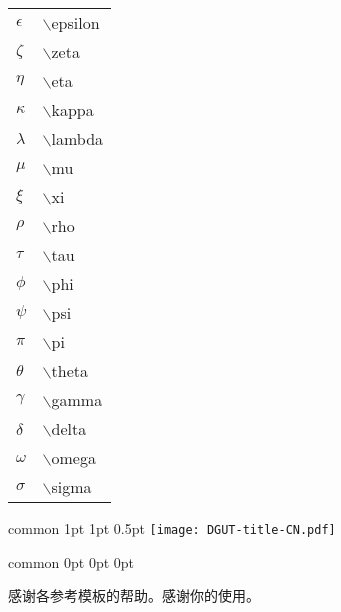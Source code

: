 \documentclass[report,oneside,UTF8,zihao=-4]{config}
\begin{document}
\begin{center}
\begin{tabular}{ll}
    $\epsilon$ &  $\backslash$epsilon \\
    $\zeta$ &  $\backslash$zeta \\
    $\eta$ &  $\backslash$eta \\
    $\kappa$ &  $\backslash$kappa \\
    $\lambda$ &  $\backslash$lambda \\
    $\mu$ &  $\backslash$mu \\
    $\xi$ &  $\backslash$xi \\
    $\rho$ &  $\backslash$rho \\
    $\tau$ &  $\backslash$tau \\
    $\phi$ &  $\backslash$phi \\
    $\psi$ &  $\backslash$psi \\
    $\pi$ &  $\backslash$pi \\
    $\theta$ &  $\backslash$theta \\
    $\gamma$ &  $\backslash$gamma\\
    $\delta$ &  $\backslash$delta \\
    $\omega$ &  $\backslash$omega \\
    $\sigma$ &  $\backslash$sigma \\
    \end{tabular}
\end{center}


\Header
    {common} %
    {1pt} %
    {1pt} %
    {0.5pt} %
    {} %
    {\texttt{[image: DGUT-title-CN.pdf]}} %
    {} %


\Footer
    {common} %
    {0pt} %
    {0pt} %
    {0pt} %
    {} %
    {\thepage} %
    {} %




\StartAcknowledgements %

感谢各参考模板的帮助。感谢你的使用。
\end{document}
